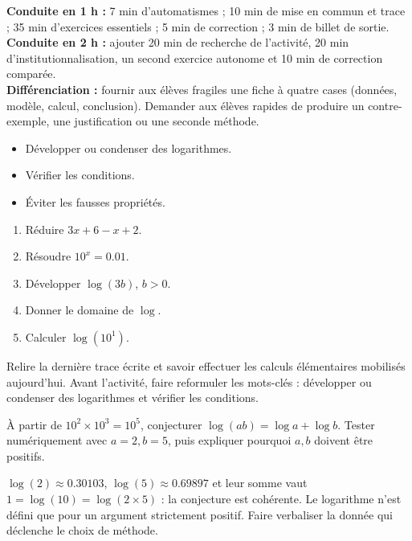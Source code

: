 \ifmxteacher
\begin{method}
\textbf{Conduite en 1 h :} 7 min d'automatismes ; 10 min de mise en commun et trace ; 35 min d'exercices essentiels ; 5 min de correction ; 3 min de billet de sortie.\\
\textbf{Conduite en 2 h :} ajouter 20 min de recherche de l'activité, 20 min d'institutionnalisation, un second exercice autonome et 10 min de correction comparée.\\
\textbf{Différenciation :} fournir aux élèves fragiles une fiche à quatre cases (données, modèle, calcul, conclusion). Demander aux élèves rapides de produire un contre-exemple, une justification ou une seconde méthode.
\end{method}
\fi
{}
\begin{objectives}\begin{itemize}\item Développer ou condenser des logarithmes.\item Vérifier les conditions.\item Éviter les fausses propriétés.\end{itemize}\end{objectives}
\begin{fluency}\begin{enumerate}\item Réduire $3x+6-x+2$. \item Résoudre $10^x=\num{0,01}$. \item Développer $\log(3b)$, $b>0$. \item Donner le domaine de $\log$. \mxblank{$]0,+\infty[$}\item Calculer $\log(10^1)$. \end{enumerate}\end{fluency}
\begin{prerequisites}Relire la dernière trace écrite et savoir effectuer les calculs élémentaires mobilisés aujourd'hui. Avant l'activité, faire reformuler les mots-clés : développer ou condenser des logarithmes et vérifier les conditions.\end{prerequisites}

\begin{activity}
À partir de $10^2\times10^3=10^5$, conjecturer $\log(ab)=\log a+\log b$. Tester numériquement avec $a=2,b=5$, puis expliquer pourquoi $a,b$ doivent être positifs.

\end{activity}
\begin{solution}$\log(2)\approx\num{0,30103}$, $\log(5)\approx\num{0,69897}$ et leur somme vaut $1=\log(10)=\log(2\times5)$ : la conjecture est cohérente. Le logarithme n'est défini que pour un argument strictement positif. Faire verbaliser la donnée qui déclenche le choix de méthode.\end{solution}

